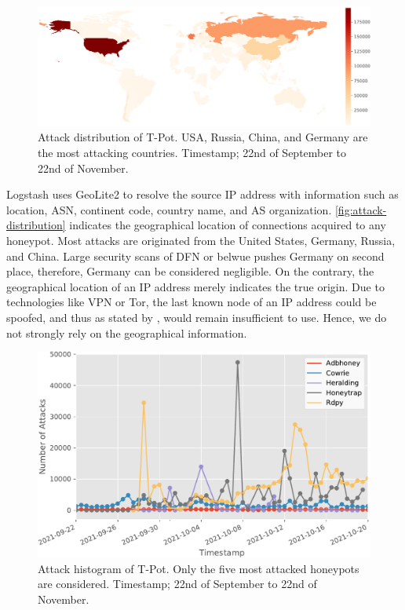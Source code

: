 \begin{figure}[ht]
    \centering
    \includegraphics[width=\textwidth]{figures/tpot-overview-map.pdf}
    \caption[Attack distribution of T-Pot]{Attack distribution of T-Pot. USA, Russia, China, and Germany are the most attacking countries. Timestamp; 22nd of September to 22nd of November.}
    \label{fig:attack-distribution}
\end{figure}

Logstash uses GeoLite2 to resolve the source IP address with information such as location, ASN, continent code, country name, and AS organization.
\autoref{fig:attack-distribution} indicates the geographical location of connections acquired to any honeypot.
Most attacks are originated from the United States, Germany, Russia, and China.
Large security scans of DFN or \ac{belwue} pushes Germany on second place, therefore, Germany can be considered negligible.
On the contrary, the geographical location of an IP address merely indicates the true origin.
Due to technologies like VPN or Tor, the last known node of an IP address could be spoofed, and thus as stated by \citet{Kelly2021}, would remain insufficient to use.
Hence, we do not strongly rely on the geographical information.

\begin{figure}[ht]
    \centering
    \includegraphics[width=\textwidth]{figures/tpot-attacks-histogram.pdf}
    \caption[Attack histogram of T-Pot]{Attack histogram of T-Pot. Only the five most attacked honeypots are considered. Timestamp; 22nd of September to 22nd of November.}
    \label{tpot-overview-histogram}
\end{figure}

